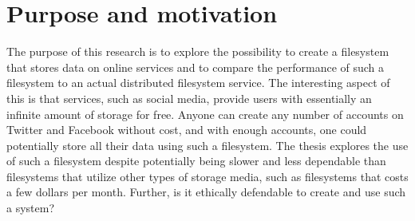 
\section{Purpose and motivation}

The purpose of this research is to explore the possibility to create a filesystem that stores data on online services and to compare the performance of such a filesystem to an actual distributed filesystem service. The interesting aspect of this is that services, such as social media, provide users with essentially an infinite amount of storage for free. Anyone can create any number of accounts on Twitter and Facebook without cost, and with enough accounts, one could potentially store all their data using such a filesystem. The thesis explores the use of such a filesystem despite potentially being slower and less dependable than filesystems that utilize other types of storage media, such as filesystems that costs a few dollars per month. Further, is it ethically defendable to create and use such a system?

